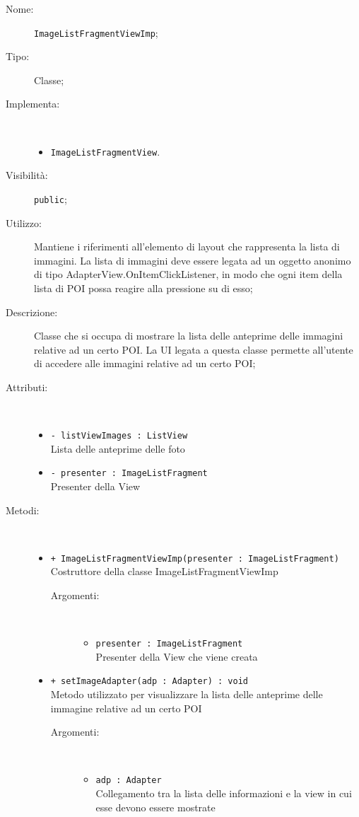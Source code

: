 \documentclass[../DefinizioneDiProdotto.tex]{subfiles}
\begin{document}
    \begin{description}
\item[Nome:] \texttt{ImageListFragmentViewImp};
\item[Tipo:] Classe;
\item[Implementa:] \
\begin{itemize}
\item \texttt{ImageListFragmentView}.

\end{itemize}
\item[Visibilità:] \texttt{public};
\item[Utilizzo:] Mantiene i riferimenti all'elemento di layout che rappresenta la lista di immagini. La lista di immagini deve essere legata ad un oggetto anonimo di tipo AdapterView.OnItemClickListener, in modo che ogni item della lista di POI possa reagire alla pressione su di esso;
\item[Descrizione:] Classe che si occupa di mostrare la lista delle anteprime delle immagini relative ad un certo POI. La UI legata a questa classe permette all'utente di accedere alle immagini relative ad un certo POI;
\item[Attributi:] \
\begin{itemize}
\item \texttt{- listViewImages : ListView}\\
Lista delle anteprime delle foto

\item \texttt{- presenter : ImageListFragment}\\
Presenter della View

\end{itemize}
\item[Metodi:] \
\begin{itemize}
\item \texttt{+ ImageListFragmentViewImp(presenter : ImageListFragment)}\\
Costruttore della classe ImageListFragmentViewImp
 \begin{description}
\item[Argomenti:] \
\begin{itemize}
\item \texttt{presenter : ImageListFragment}\\
Presenter della View che viene creata\end{itemize}
\end{description}
\item \texttt{+ setImageAdapter(adp : Adapter) : void}\\
Metodo utilizzato per visualizzare la lista delle anteprime delle immagine relative ad un certo POI
 \begin{description}
\item[Argomenti:] \
\begin{itemize}
\item \texttt{adp : Adapter}\\
Collegamento tra la lista delle informazioni e la view in cui esse devono essere mostrate\end{itemize}
\end{description}
\end{itemize}
\end{description}
\end{document}
